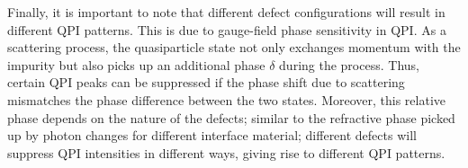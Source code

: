 Finally, it is important to note that different defect configurations will result in different \ac{QPI} patterns. This is due to gauge-field phase sensitivity in \ac{QPI}. As a scattering process, the quasiparticle state not only exchanges momentum with the impurity but also picks up an additional phase $\delta$ during the process. Thus, certain QPI peaks can be suppressed if the phase shift due to scattering mismatches the phase difference between the two states. Moreover, this relative phase depends on the nature of the defects; similar to the refractive phase picked up by photon changes for different interface material; different defects will suppress \ac{QPI} intensities in different ways, giving rise to different \ac{QPI} patterns. 





